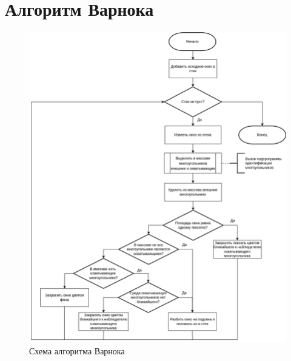 \chapter{Алгоритм Варнока}
\label{cha:appendix3}

\begin{figure}[h]
	\centering
	\includegraphics[scale=0.1725 ]{img/flowchart/subdivide3.png}
	\caption{Схема алгоритма Варнока}
	\label{fig:warnock_algorithm}
\end{figure} 

